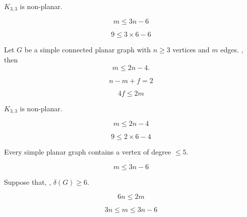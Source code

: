 \begin{frame}{}
  \begin{theorem}
    $K_{3, 3}$ is non-planar.
  \end{theorem}

  \pause
  \[
    m \le 3n -6
  \]

  \pause
  \[
    9 \le 3 \times 6 - 6
  \]

  \pause
\end{frame}

\begin{frame}{}
  \begin{theorem}
    Let $G$ be a simple connected planar graph with $n \ge 3$ vertices
    and $m$ edges. , then
    \[
      m \le 2n - 4.
    \]
  \end{theorem}

  \pause
  \[
    n - m + f = 2
  \]

  \pause
  \[
    4f \le 2m
  \]
\end{frame}

\begin{frame}{}
  \begin{theorem}
    $K_{3, 3}$ is non-planar.
  \end{theorem}

  \pause
  \[
    m \le 2n -4
  \]

  \pause
  \[
    9 \le 2 \times 6 - 4
  \]
\end{frame}

\begin{frame}{}
  \begin{theorem}
    Every simple planar graph contains a vertex of degree $\le 5$.
  \end{theorem}

  \pause
  \[
    m \le 3n - 6
  \]

  \pause
  \begin{center}
    Suppose that, , $\delta(G) \ge 6$.
  \end{center}

  \pause
  \[
    6n \le 2m
  \]

  \pause
  \[
    3n \le m \le 3n - 6
  \]
\end{frame}
